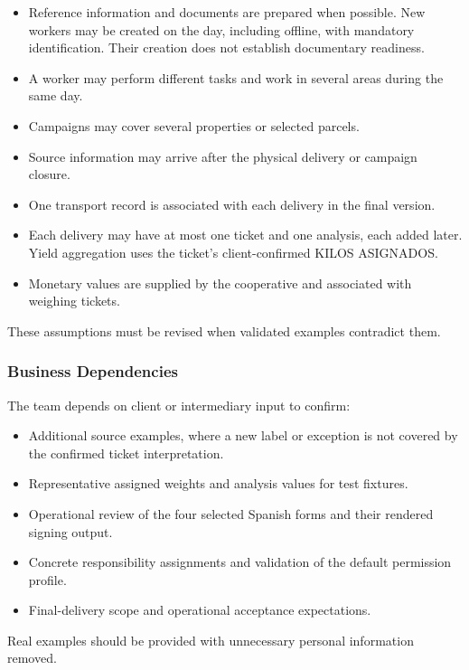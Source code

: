 \begin{itemize}
    \item Reference information and documents are prepared when possible. New workers
    may be created on the day, including offline, with mandatory identification.
    Their creation does not establish documentary readiness.
    \item A worker may perform different tasks
    and work in several areas during the same day.
    \item Campaigns may cover several properties
    or selected parcels.
    \item Source information may arrive
    after the physical delivery
    or campaign closure.
    \item One transport record is associated
    with each delivery in the final version.
    \item Each delivery may have at most one ticket and one analysis, each added later. Yield aggregation uses the ticket's client-confirmed KILOS ASIGNADOS.
    \item Monetary values are supplied
    by the cooperative and associated
    with weighing tickets.
\end{itemize}

These assumptions must be revised
when validated examples contradict them.

\subsubsection{Business Dependencies}

The team depends on client or intermediary input
to confirm:

\begin{itemize}
    \item Additional source examples, where a new label or exception is not covered by the confirmed ticket interpretation.
    \item Representative assigned weights and analysis values for test fixtures.
    \item Operational review of the four selected Spanish forms and their rendered signing output.
    \item Concrete responsibility assignments and validation of the default permission profile.
    \item Final-delivery scope
    and operational acceptance expectations.
\end{itemize}

Real examples should be provided
with unnecessary personal information removed.

